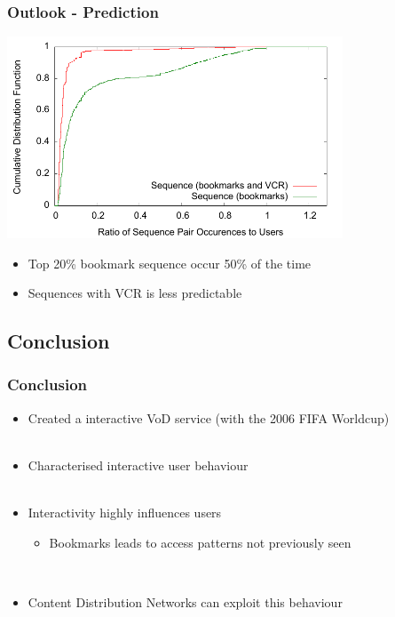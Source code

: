 \documentclass[xcolor=pdftex,dvipsnames,table]{beamer}
\begin{document}
\begin{frame}
    \frametitle{Outlook - Prediction}

    \includegraphics[width=10cm]{all_sequence_normal_cdf}

    {\footnotesize
    \begin{itemize}
        \item {Top 20\% bookmark sequence occur 50\% of the time}
        \item {Sequences with VCR is less predictable}
    \end{itemize}
    }

\end{frame}

\subsection{Conclusion}

\begin{frame}
    \frametitle{Conclusion}

    \begin{itemize}
        \item Created a interactive VoD service (with the 2006 FIFA Worldcup)~\\~\\

        \item Characterised interactive user behaviour~\\~\\

        \item Interactivity highly influences users~\\
        \begin{itemize}
            \item Bookmarks leads to access patterns not previously seen
        \end{itemize}~\\

        \item Content Distribution Networks can exploit this behaviour~\\~\\
    \end{itemize}

\end{frame}
\end{document}
